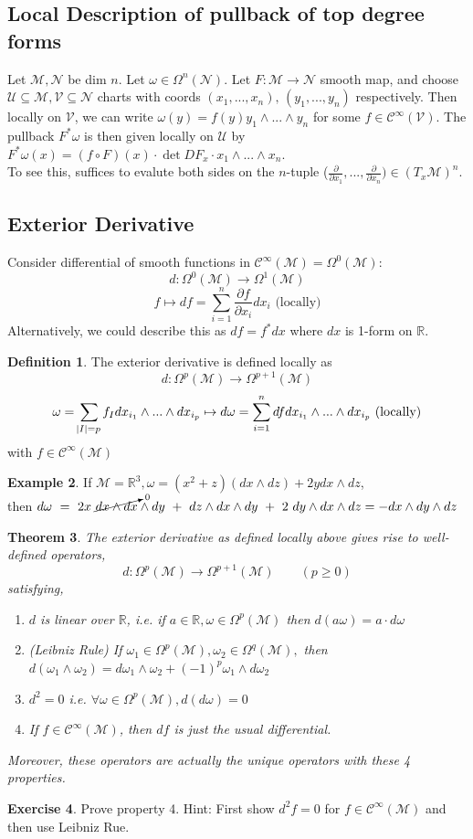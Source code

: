 \documentclass[10pt]{article}
\theoremstyle{plain}
\newtheorem{thm}{Theorem}[section] %
\theoremstyle{definition}
\newtheorem{defn}[thm]{Definition} %
\newtheorem{exmp}[thm]{Example} %
\newtheorem{exercise}[thm]{Exercise}
\newcommand{\Real}{\mathbb{R}}
\newcommand{\man}{\mathcal{M}}
\newcommand{\nan}{\mathcal{N}}
\newcommand{\chartU}{\mathcal{U}}
\newcommand{\allthe}[3]{{#1}_{#2},...,{#1}_{#3}}
\newcommand{\wedgge}{\omega_1\wedge\omega_2}
\newcommand{\allthewedge}[3]{{#1}_{#2}\wedge...\wedge{#1}_{#3}}
\newcommand{\tang}{T_x\man}
\newcommand{\pformman}[1]{\Omega^{#1}(\man)}
\newcommand{\pformnan}[1]{\Omega^{#1}(\nan)}
\newcommand{\iparderiv}[1]{\frac{\partial}{\partial x_{#1}}}
\newcommand{\iparderivof}[2]{\frac{\partial {#2}}{\partial x_{#1}}}
\newcommand{\dx}{dx}
\newcommand{\dy}{dy}
\newcommand{\dz}{dz}
\newcommand{\deriv}{d}
\newcommand{\df}{df}
\newcommand{\dw}{d\omega}
\newcommand{\cts}[1]{\mathcal{C}^{\infty}(#1)}
\newcommand{\sumfromto}[2]{\sum\limits_{#1}^{#2}}
\newcommand{\mysubsection}[1]{
    \subsection{#1}
}
\begin{document}
\mysubsection{Local Description of pullback of top degree forms}
Let $\man,\nan$ be dim $n$. Let $\omega \in \pformnan{n}$. Let $F:\man \to \nan$ smooth map, and choose $\chartU \subseteq\man, \mathcal{V} \subseteq\nan$ charts with coords $(\allthe{x}{1}{n}) , \, (\allthe{y}{1}{n})$ respectively. Then locally on $\mathcal{V}$, we can write $\omega(y) = f(y) \allthewedge{y}{1}{n}$ for some $f\in \cts{\mathcal{V}}$. The pullback $F^*\omega$ is then given locally on $\chartU$ by $F^*\omega(x) = (f\circ F)(x) \cdot \det DF_x \cdot \allthewedge{x}{1}{n}.$ \\
To see this, suffices to evalute both sides on the $n$-tuple ($\iparderiv{1},...,\iparderiv{n})\in(\tang)^n$.
\mysubsection{Exterior Derivative}
Consider differential of smooth functions in $\cts{\man} = \pformman{0}$:
$$\deriv : \pformman{0} \to \pformman{1}$$
$$ f \mapsto \df = \sumfromto{i=1}{n} \iparderivof{i}{f} \dx_i \text{   (locally)}$$
Alternatively, we could describe this as $\df = f^* \dx$ where $\dx$ is 1-form on $\Real$.
\begin{defn}
The exterior derivative is defined locally as
$$\deriv : \pformman{p} \to \pformman{p+1}$$
$$ \omega = \sum\limits_{\abs{I} = p} f_I \allthewedge{dx}{i_1}{i_p}\mapsto \dw = \sumfromto{i=1}{n} \df \allthewedge{dx}{i_1}{i_p} \text{   (locally)}$$
with $f\in\cts{\man}$
\end{defn}
\begin{exmp}
If $\man = \Real^3, \omega = (x^2 + z)(\dx\wedge\dz) + 2y\dx\wedge\dz$,\\ then $\dw~=~2x~\cancelto{0}{\dx\wedge\dx}\wedge\dy~+~\dz\wedge\dx\wedge\dy~+~2~\dy\wedge\dx\wedge\dz = - \dx\wedge\dy\wedge\dz $
\end{exmp}

\begin{thm}
The exterior derivative as defined locally above gives rise to well-defined operators,
$$\deriv : \pformman{p} \to \pformman{p+1} \qquad (p\geq 0)$$
satisfying,
\begin{enumerate}
    \item $\deriv$ is linear over $\Real$, i.e. if $a\in\Real,\omega \in \pformman{p}$ then $\deriv(a\omega) = a \cdot\dw$
    \item (Leibniz Rule) If $\omega_1 \in \pformman{p},\omega_2 \in \pformman{q}, $ then $\deriv(\wedgge) = \dw_1\wedge\omega_2 +(-1)^p\omega_1\wedge \dw_2$
    \item $\deriv ^2 = 0$ i.e. $\forall \omega \in \pformman{p} , \deriv(\dw) = 0$
    \item If $f\in\cts{\man}$, then $\df$ is just the usual differential.
\end{enumerate}
Moreover, these operators are actually the unique operators with these 4 properties.
\end{thm}
\begin{exercise}
Prove property 4. Hint: First show $\deriv^2f = 0$ for $f\in\cts{\man}$ and then use Leibniz Rue.
\end{exercise}
\end{document}
